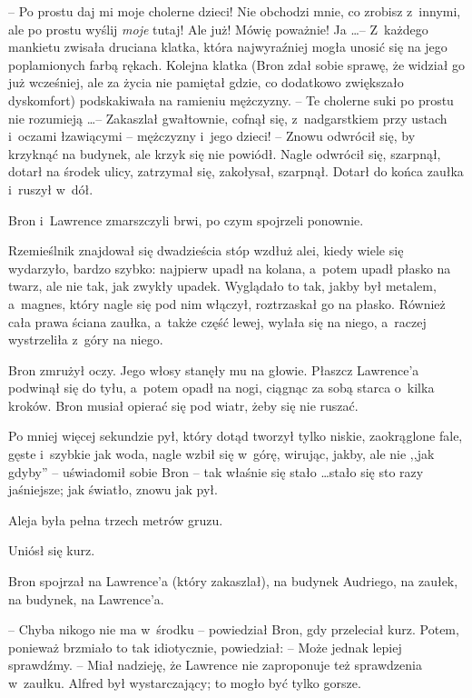 \documentclass[oneside,polish,11pt,rmheadings]{mwbk}
\begin{document}
-- Po prostu daj mi moje cholerne dzieci! Nie obchodzi mnie, co zrobisz z~innymi, ale po prostu wyślij \textit{moje } tutaj! Ale już! Mówię poważnie! Ja \ldots  -- Z~każdego mankietu zwisała druciana klatka, która najwyraźniej mogła unosić się na jego poplamionych farbą rękach. Kolejna klatka (Bron zdał sobie sprawę, że widział go już wcześniej, ale za życia nie pamiętał gdzie, co dodatkowo zwiększało dyskomfort) podskakiwała na ramieniu mężczyzny. -- Te cholerne suki po prostu nie rozumieją \ldots  -- Zakaszlał gwałtownie, cofnął się, z~nadgarstkiem przy ustach i~oczami łzawiącymi --  mężczyzny i~jego dzieci!  -- Znowu odwrócił się, by krzyknąć na budynek, ale krzyk się nie powiódł. Nagle odwrócił się, szarpnął, dotarł na środek ulicy, zatrzymał się, zakołysał, szarpnął. Dotarł do końca zaułka i~ruszył w~dół. 

Bron i~Lawrence zmarszczyli brwi, po czym spojrzeli ponownie. 

Rzemieślnik znajdował się dwadzieścia stóp wzdłuż alei, kiedy wiele się wydarzyło, bardzo szybko: najpierw upadł na kolana, a~potem upadł płasko na twarz, ale nie tak, jak zwykły upadek. Wyglądało to tak, jakby był metalem, a~magnes, który nagle się pod nim włączył, roztrzaskał go na płasko. Również cała prawa ściana zaułka, a~także część lewej, wylała się na niego, a~raczej wystrzeliła z~góry na niego. 

Bron zmrużył oczy. Jego włosy stanęły mu na głowie. Płaszcz Lawrence'a podwinął się do tyłu, a~potem opadł na nogi, ciągnąc za sobą starca o~kilka kroków. Bron musiał opierać się pod wiatr, żeby się nie ruszać. 

Po mniej więcej sekundzie pył, który dotąd tworzył tylko niskie, zaokrąglone fale, gęste i~szybkie jak woda, nagle wzbił się w~górę, wirując, jakby, ale nie ,,jak gdyby'' -- uświadomił sobie Bron -- tak właśnie się stało  \ldots  stało się sto razy jaśniejsze; jak światło, znowu jak pył. 

Aleja była pełna trzech metrów gruzu. 

Uniósł się kurz. 

Bron spojrzał na Lawrence'a (który zakaszlał), na budynek Audriego, na zaułek, na budynek, na Lawrence'a. 

-- Chyba nikogo nie ma w~środku -- powiedział Bron, gdy przeleciał kurz. Potem, ponieważ brzmiało to tak idiotycznie, powiedział: -- Może jednak lepiej sprawdźmy. -- Miał nadzieję, że Lawrence nie zaproponuje też sprawdzenia w~zaułku. Alfred był wystarczający; to mogło być tylko gorsze. 
\end{document}

